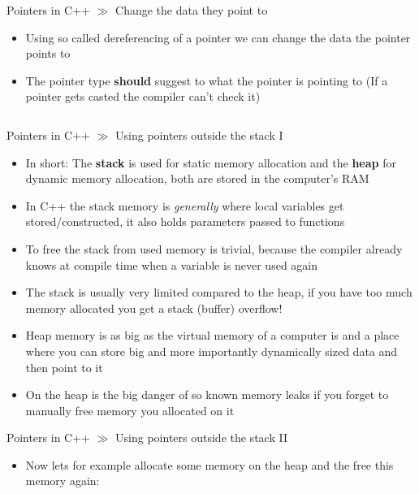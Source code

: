 \documentclass[10pt]{beamer}
\begin{document}
\begin{frame}{Pointers in C++ $\gg$ Change the data they point to}
\begin{itemize}
	\item Using so called dereferencing of a pointer we can change the data the pointer points to
	\item The pointer type \textbf{should} suggest to what the pointer is pointing to (If a pointer gets casted the compiler can't check it)
	\inputminted[bgcolor=lightGreyCustom,fontsize=\scriptsize]{cpp}{./resources/change_ptr_data.cpp}
\end{itemize}
\end{frame}

\begin{frame}{Pointers in C++ $\gg$ Using pointers outside the stack I}
\begin{itemize}
	\item In short: The \textbf{stack} is used for static memory allocation and the \textbf{heap} for dynamic memory allocation, both are stored in the computer's RAM
	\item In C++ the stack memory is \textit{generally} where local variables get stored/constructed, it also holds parameters passed to functions
	\item To free the stack from used memory is trivial, because the compiler already knows at compile time when a variable is never used again
	\item The stack is usually very limited compared to the heap, if you have too much memory allocated you get a stack (buffer) overflow!
	\item Heap memory is as big as the virtual memory of a computer is and a place where you can store big and more importantly dynamically sized data and then point to it
	\item On the heap is the big danger of so known memory leaks if you forget to manually free memory you allocated on it
\end{itemize}
\end{frame}

\begin{frame}{Pointers in C++ $\gg$ Using pointers outside the stack II}
\begin{itemize}
	\item Now lets for example allocate some memory on the heap and the free this memory again:
	\inputminted[bgcolor=lightGreyCustom,fontsize=\scriptsize]{cpp}{./resources/heap_ptr.cpp}
\end{itemize}
\end{frame}
\end{document}
